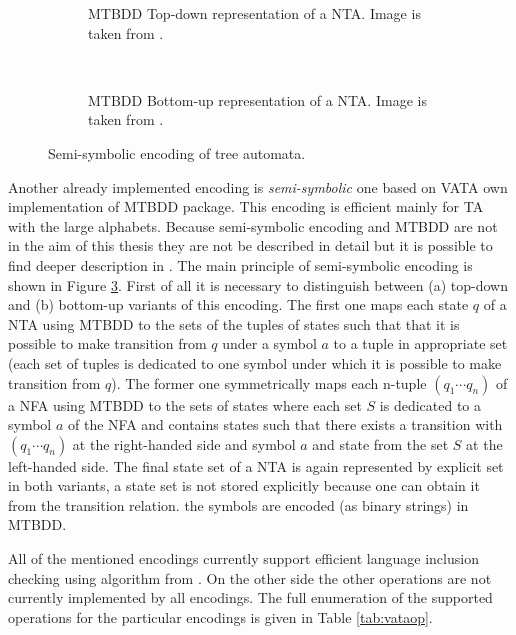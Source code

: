 \begingroup
{}%
\begin{figure}[bt]
	\centering
	\begin{subfigure}{.5\textwidth}
		\centering
		
		\caption{MTBDD Top-down representation of a NTA. Image is taken from \cite{libvata}.}
		\label{fig:mtbdd_td}
	\end{subfigure}%
	~
	\begin{subfigure}{.5\textwidth}
	\centering
	
	\caption{MTBDD Bottom-up representation of a NTA. Image is taken from \cite{libvata}.}
	\label{fig:mtbdd_bu}
	\end{subfigure}%
\caption{Semi-symbolic encoding of tree automata.}
\label{fig:symnta}
\end{figure}
\endgroup

Another already implemented encoding is \emph{semi-symbolic} one based on VATA own implementation of MTBDD package.
This encoding is efficient mainly for TA with the large alphabets.
Because semi-symbolic encoding and MTBDD are not in the aim of this thesis they are not be described in detail
but it is possible to find deeper description in \cite{mt:lengal}.
The main principle of semi-symbolic encoding is shown in Figure \ref{fig:symnta}.
First of all it is necessary to distinguish between (a) top-down and (b) bottom-up variants of this encoding.
The first one maps each state $q$ of a NTA using MTBDD to the sets of the tuples of states such that that it is possible
to make transition from $q$ under a symbol $a$ to a tuple in appropriate set (each set of tuples is dedicated
to one symbol under which it is possible to make transition from $q$).
The former one symmetrically maps each n-tuple $(q_1 \cdots q_n)$ of a NFA using MTBDD to the sets of states
where each set $S$ is dedicated to a symbol $a$ of the NFA and contains states such that there exists a transition
with $(q_1 \cdots q_n)$ at the right-handed side and symbol $a$ and state from the set $S$ at the left-handed side.
The final state set of a NTA is again represented by explicit set in both variants,
a state set is not stored explicitly because one can obtain it from the transition relation.
the symbols are encoded (as binary strings) in MTBDD.

All of the mentioned encodings currently support efficient language inclusion checking using algorithm
from \cite{tacas10}.
On the other side the other operations are not currently implemented by all encodings.
The full enumeration of the supported operations for the particular encodings is given in Table \ref{tab:vataop}.

